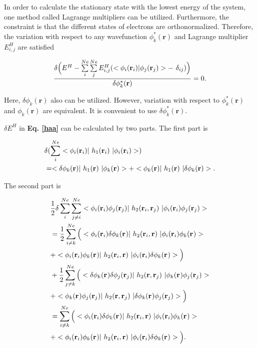 \documentclass[a4paper, 12pt, titlepage,oneside,drop]{kthesis}
\begin{document}
In order to calculate the stationary state with the lowest energy of the system, one method called Lagrange multipliers can be utilized. Furthermore, the constraint is that the different states of electrons are orthonormalized.
Therefore, the variation with respect to any wavefunction $\phi^*_{k}(\textbf{r})$ and Lagrange multiplier $E_{i,j}^{H}$ are satisfied \cite{clasdft,bertsekas2003convex}

\begin{equation}\begin{split}\label{haa}
 \frac{ \delta  \Big(E^{{H}} - \sum\limits_{i}^{Ne} \sum\limits_{j}^{Ne} E_{i,j}^{H} (<\bwff<i><i> | \bwff<j><j>> -\ \delta_{ij})\Big)}{\delta \phi^*_{k}(\textbf{r})}  = 0. 
\end{split}
\end{equation}


Here, $ \delta \phi_{k}(\textbf{r})$ also can be utilized. However, variation with respect to $\phi^*_{k}(\textbf{r})$ and $\phi_{k}(\textbf{r})$ are equivalent. It is convenient to use $\delta \phi^*_{k}(\textbf{r})$.

$\delta E^{{H}}$ in \textbf{Eq. \ref{haa}} can be calculated by two parts. The first part is 

\begin{equation}\begin{split}\label{hartree1}
&  \delta ( \sum\limits_i^{{Ne}} <\bwff<i><i> |\ h_1(\textbf{r}_{i})  \ | \bwff<i><i> > )  \\
& =  < \delta \phi_{{k}}(\textbf{r}) |\ h_1(\textbf{r})  \ |  \phi_{{k}}(\textbf{r}) >  +  < \phi_{{k}}(\textbf{r}) |\ h_1(\textbf{r})  \ | \delta \phi_{{k}}(\textbf{r}) >. 
\end{split}\end{equation}

The second part is

\begin{equation}\begin{split}\label{hartree2}
& \frac{1}{2} \delta \sum\limits_i^{{Ne}} \sum\limits_{j \neq i}^{{Ne}} <\bwff<i><i> \bwff<j><j>|\ h_2(\textbf{r}_{i},\textbf{r}_{j}) \ | \bwff<i><i> \bwff<j><j>> \\
& = \frac{1}{2}  \sum\limits_{i \neq k}^{{Ne}} \Big( <\bwff<i><i>  \delta \bwff<k><>|\ h_2(\textbf{r}_{i},\textbf{r}) \ | \bwff<i><i> \bwff<k><>> \\
& + <\bwff<i><i>  \bwff<k><>|\ h_2(\textbf{r}_{i},\textbf{r}) \ | \bwff<i><i> \delta \bwff<k><>> \Big) \\
& + \frac{1}{2}  \sum\limits_{j \neq k}^{{Ne}} \Big( <\delta \bwff<k><>  \delta \bwff<j><j>|\ h_2(\textbf{r},\textbf{r}_{j}) \ | \bwff<k><> \bwff<j><j>> \\
& + < \bwff<k><>  \bwff<j><j>|\ h_2(\textbf{r},\textbf{r}_{j}) \ | \delta \bwff<k><> \bwff<j><j>> \Big) \\
& =   \sum\limits_{i \neq k}^{{Ne}} \Big( <\bwff<i><i>  \delta \bwff<k><>|\ h_2(\textbf{r}_{i},\textbf{r}) \ | \bwff<i><i> \bwff<k><>> \\
& + <\bwff<i><i>  \bwff<k><>|\ h_2(\textbf{r}_{i},\textbf{r}) \ | \bwff<i><i> \delta \bwff<k><>> \Big). 
\end{split}\end{equation}
\end{document}
